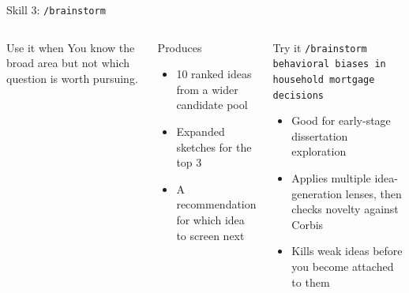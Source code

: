 \documentclass[aspectratio=169,professionalfonts]{beamer}
\begin{document}
\begin{frame}[t]{Skill 3: \texttt{/brainstorm}}
\small
\begin{columns}[T,onlytextwidth]
\begin{block}{Use it when}
You know the broad area but not which question is worth pursuing.
\end{block}
\begin{block}{Produces}
\begin{itemize}
  \item 10 ranked ideas from a wider candidate pool
  \item Expanded sketches for the top 3
  \item A recommendation for which idea to screen next
\end{itemize}
\end{block}
\begin{exampleblock}{Try it}
{\small\texttt{/brainstorm behavioral biases in household mortgage decisions}}
\medskip
\begin{itemize}
  \item Good for early-stage dissertation exploration
  \item Applies multiple idea-generation lenses, then checks novelty against Corbis
  \item Kills weak ideas before you become attached to them
\end{itemize}
\end{exampleblock}
\end{columns}
\end{frame}
\end{document}
